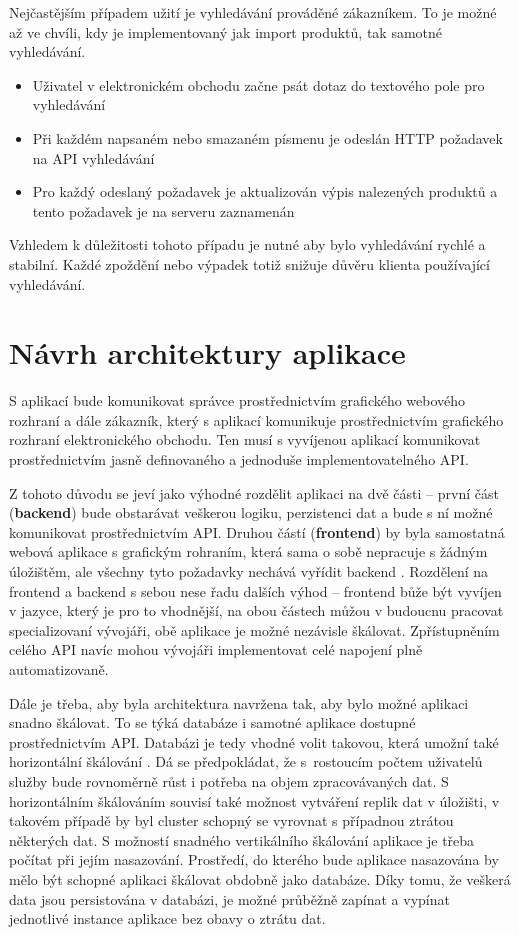 \documentclass[FM,DP]{tulthesis}
\begin{document}
Nejčastějším případem užití je vyhledávání prováděné zákazníkem. To je možné až ve chvíli, 
kdy je implementovaný jak import produktů, tak samotné vyhledávání. 

\begin{itemize}
\item Uživatel v elektronickém obchodu začne psát dotaz do textového pole pro vyhledávání
\item Při každém napsaném nebo smazaném písmenu je odeslán HTTP požadavek na API vyhledávání
\item Pro každý odeslaný požadavek je aktualizován výpis nalezených produktů a tento požadavek
je na serveru zaznamenán
\end{itemize}

Vzhledem k důležitosti tohoto případu je nutné aby bylo vyhledávání rychlé a stabilní.
Každé zpoždění nebo výpadek totiž snižuje důvěru klienta používající vyhledávání.

\section{Návrh architektury aplikace}

S aplikací bude komunikovat správce prostřednictvím grafického webového rozhraní a dále
zákazník, který s aplikací komunikuje prostřednictvím grafického rozhraní elektronického 
obchodu. Ten musí s vyvíjenou aplikací komunikovat prostřednictvím jasně definovaného
a jednoduše implementovatelného API.

Z tohoto důvodu se jeví jako výhodné rozdělit aplikaci na dvě části -- první část (\textbf{backend}) 
bude obstarávat veškerou logiku, perzistenci dat a bude s ní možné komunikovat prostřednictvím API. 
Druhou částí (\textbf{frontend}) by byla samostatná webová aplikace s grafickým rohraním, která 
sama o sobě nepracuje s žádným úložištěm, ale všechny tyto požadavky nechává vyřídit backend \cite{backend}. 
Rozdělení na frontend a backend s sebou nese řadu dalších výhod -- frontend bůže být vyvíjen
v jazyce, který je pro to vhodnější, na obou částech můžou v budoucnu pracovat specializovaní
vývojáři, obě aplikace je možné nezávisle škálovat. Zpřístupněním celého API navíc mohou
vývojáři implementovat celé napojení plně automatizovaně.

Dále je třeba, aby byla architektura navržena tak, aby bylo možné aplikaci snadno škálovat. 
To se týká databáze i samotné aplikace dostupné prostřednictvím API. Databázi je tedy
vhodné volit takovou, která umožní také horizontální škálování \cite{scaling}. Dá se předpokládat, 
že s~rostoucím počtem uživatelů služby bude rovnoměrně růst i potřeba na objem zpracovávaných
dat. S horizontálním škálováním souvisí také možnost vytváření replik dat v úložišti, 
v takovém případě by byl cluster schopný se vyrovnat s případnou ztrátou některých dat.
S možností snadného vertikálního škálování aplikace je třeba počítat při jejím nasazování.
Prostředí, do kterého bude aplikace nasazována by mělo být schopné aplikaci škálovat
obdobně jako databáze. Díky tomu, že veškerá data jsou persistována v databázi, je možné
průběžně zapínat a vypínat jednotlivé instance aplikace bez obavy o ztrátu dat.\\
\end{document}
